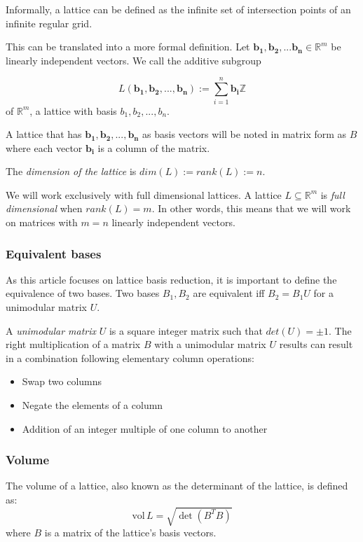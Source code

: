 \documentclass[10pt, a4paper]{article}
\renewcommand{\vec}[1]{\mathbf{#1}}
\begin{document}
Informally, a lattice can be defined as the infinite set of intersection points of an infinite regular grid.

This can be translated into a more formal definition\cite{SchnorrStanfordNotes}.\newline 
Let $\vec{b_1}, \vec{b_2}, ... \vec{b_n} \in \mathbb{R}^m$ be linearly independent vectors. We call the additive subgroup

\[
L(\vec{b_1}, \vec{b_2},..., \vec{b_n}):= \displaystyle\sum_{i=1}^{n} \vec{b_i} \mathbb{Z}
\] of $\mathbb{R}^m$, a lattice with basis $b_1,b_2,...,b_n$.

A lattice that has $\vec{b_1},\vec{b_2},...,\vec{b_n}$ as basis vectors will be noted in matrix form as $B$ where each vector $\vec{b_i}$ is a column of the matrix.

The \emph{dimension of the lattice} is $dim(L) := rank(L) := n$.

We will work exclusively with full dimensional lattices. A lattice $L \subseteq \mathbb{R}^m$ is \emph{full dimensional} when $rank(L)=m$. In other words, this means that we will work on matrices with $m=n$ linearly independent vectors.

\subsubsection{Equivalent bases}

As this article focuses on lattice basis reduction, it is important to define the equivalence of two bases. Two bases $B_1 , B_2$ are equivalent iff $B_2 = B_1 U$ for a unimodular matrix $U$.

A \emph{unimodular matrix} $U$ is a square integer matrix such that $det(U) = \pm 1$. The right multiplication of a matrix $B$ with a unimodular matrix $U$ results can result in a combination following elementary column operations:
\begin{itemize}
\item Swap two columns
\item Negate the elements of a column
\item Addition of an integer multiple of one column to another
\end{itemize}

\subsubsection{Volume}

The volume of a lattice, also known as the determinant of the lattice, is defined as:
\[
\text{vol} \,L = \sqrt{\det(B^T B)}
\] where $B$ is a matrix of the lattice's basis vectors.
\end{document}

